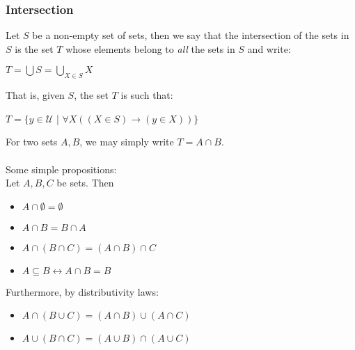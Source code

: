 \documentclass[a4paper]{article}
\begin{document}
\subsubsection{Intersection}
Let $S$ be a non-empty set of sets, then we say that the intersection of the sets in $S$ is the set $T$ whose elements belong to \textit{all} the sets in $S$ and write:
\begin{center}
	$T = \bigcup S = \bigcup\limits_{X\in S}X$
\end{center}
That is, given $S$, the set $T$ is such that:
\begin{center}
	$T = \{y\in \mathcal{U}$ | $\forall X ((X\in S) \rightarrow (y \in X))\}$
\end{center}
For two sets $A, B$, we may simply write $T = A \cap B$.\\\\
Some simple propositions:\\
Let $A, B, C$ be sets. Then
\begin{itemize}
	\item $A\cap \emptyset = \emptyset$
	\item $A\cap B = B\cap A$
	\item $A\cap (B\cap C) = (A\cap B) \cap C$
	\item $A\subseteq B \leftrightarrow A\cap B = B$
\end{itemize}
Furthermore, by distributivity laws:
\begin{itemize}
	\item $A\cap (B\cup C) = (A\cap B) \cup (A\cap C)$
	\item $A\cup (B\cap C) = (A\cup B) \cap (A\cup C)$
\end{itemize}
\end{document}
